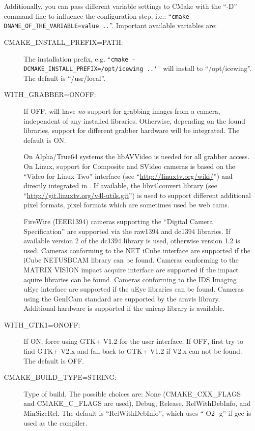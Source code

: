 Additionally, you can pass different variable settings to CMake with
the ``-D'' command line to influence the configuration step, i.e.:
``\verb|cmake -DNAME_OF_THE_VARIABLE=value ..|''. Important
available variables are:
\begin{description}
\item[CMAKE\_INSTALL\_PREFIX=PATH:] The installation prefix, e.g.
  ``\verb|cmake -DCMAKE_INSTALL_PREFIX=/opt/icewing ..''| will
  install \icewing{} to ``/opt/icewing''. The default is
  ``/usr/local''.
\item[WITH\_GRABBER=ON\textbar{}OFF:] If OFF, \icewing{} will have
  \emph{no} support for grabbing images from a camera, independent
  of any installed libraries. Otherwise, depending on the found
  libraries, support for different grabber hardware will be
  integrated. The default is ON.

  On Alpha/True64 systems the libAVVideo is needed for all grabber
  access. On Linux, support for Composite and SVideo cameras is
  based on the ``Video for Linux Two'' interface (see
  ``\url{http://linuxtv.org/wiki/}'') and directly integrated in
  \icewing{}. If available, the libv4lconvert library (see
  ``\url{http://git.linuxtv.org/v4l-utils.git}'') is used to support
  different additional pixel formats, pixel formats which are
  sometimes used be web cams.

  FireWire (IEEE1394) cameras supporting the ``Digital Camera
  Specification'' are supported via the raw1394 and dc1394
  libraries. If available version 2 of the dc1394 library is used,
  otherwise version 1.2 is used. Cameras conforming to the NET iCube
  interface are supported if the iCube NETUSBCAM library can be
  found. Cameras conforming to the MATRIX VISION impact acquire
  interface are supported if the impact aquire libraries can be
  found. Cameras conforming to the IDS Imaging uEye interface are
  supported if the uEye libraries can be found. Cameras using the
  GenICam standard are supported by the aravis library. Additional
  hardware is supported if the unicap library is available.
\item[WITH\_GTK1=ON\textbar{}OFF:] If ON, force using GTK+ V1.2 for
  the user interface. If OFF, first try to find GTK+ V2.x and fall
  back to GTK+ V1.2 if V2.x can not be found. The default is OFF.
\item[CMAKE\_BUILD\_TYPE=STRING:] Type of build. The possible
  choices are: None (CMAKE\_CXX\_FLAGS and CMAKE\_C\_FLAGS are
  used), Debug, Release, RelWithDebInfo, and MinSizeRel. The default
  is ``RelWithDebInfo'', which uses ``-O2 -g'' if gcc is used as the
  compiler.
\end{description}

